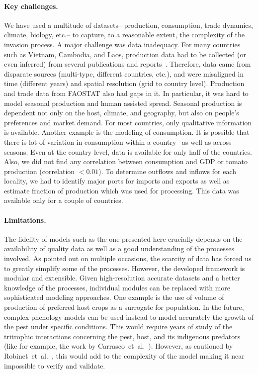 \documentclass[11pt]{article}
\theoremstyle{definition}
\begin{document}
\paragraph{Key challenges.}
We have used a multitude of datasets-- production, consumption, trade
dynamics, climate, biology, etc.-- to capture, to a reasonable extent, the
complexity of the invasion process. A major challenge was data inadequacy.
For many countries such as Vietnam, Cambodia, and Laos, production data had
to be collected (or even inferred) from several publications and
reports~\cite{}. Therefore, data came from disparate sources (multi-type,
different countries, etc.), and were misaligned in time (different years)
and spatial resolution (grid to country level). Production and trade data
from FAOSTAT also had gaps in it.  In particular, it was hard to model
seasonal production and human assisted spread. Seasonal production is
dependent not only on the host, climate, and geography, but also on people's
preferences and market demand. For most countries, only qualitative
information is available. Another example is the modeling of consumption.
It is possible that there is lot of variation in consumption within a
country~\cite{wijk2007} as well as across seasons. Even at the country
level, data is available for only half of the countries. Also, we did not
find any correlation between consumption and GDP or tomato production
(correlation $< 0.01$). To determine outflows and inflows for each locality,
we had to identify major ports for imports and exports as well as estimate
fraction of production which was used for processing. This data was
available only for a couple of countries.

\paragraph{Limitations.}
The fidelity of models such as the one presented here crucially depends on
the availability of quality data as well as a good understanding of the
processes involved. As pointed out on multiple occasions, the
scarcity of data has forced us to greatly simplify some of the processes.
However, the developed framework is modular and extensible. Given
high-resolution accurate datasets and a better knowledge of the processes,
individual modules can be replaced with more sophisticated modeling
approaches.  One example is the use of volume of production of preferred
host crops as a surrogate for population. In the future, complex phenology
models can be used instead to model accurately the growth of the pest under
specific conditions. This would require years of study of the tritrophic
interactions concerning the pest, host, and its indigenous predators (like
for example, the work by Carrasco~et~al.~\cite{carrasco2010unveiling}).
However, as cautioned by Robinet~et~al.~\cite{robinet2012suite}, this would
add to the complexity of the model making it near impossible to verify
and validate.
\end{document}
